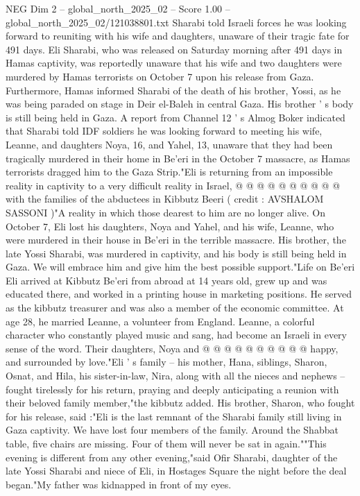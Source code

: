 \begin{textsample}{NEG Dim 2 – global\_north\_2025\_02 – Score 1.00 – global\_north\_2025\_02/121038801.txt}  \label{ex:f2_neg_013}
Sharabi told Israeli forces he was looking forward to reuniting with his wife and daughters, unaware of their tragic fate for 491 days.
Eli Sharabi, who was released on Saturday morning after 491 days in Hamas captivity, was reportedly unaware that his wife and two daughters were murdered by Hamas terrorists on October 7 upon his release from Gaza.
Furthermore, Hamas informed Sharabi of the death of his brother, Yossi, as he was being paraded on stage in Deir el-Baleh in central Gaza.
His brother ' s body is still being held in Gaza.
A report from Channel 12 ' s Almog Boker indicated that Sharabi told IDF soldiers he was looking forward to meeting his wife, Leanne, and daughters Noya, 16, and Yahel, 13, unaware that they had been tragically murdered in their home in Be'eri in the October 7 massacre, as Hamas terrorists dragged him to the Gaza Strip."Eli is returning from an impossible reality in captivity to a very difficult reality in Israel, @ @ @ @ @ @ @ @ @ @ with the families of the abductees in Kibbutz Beeri ( credit : AVSHALOM SASSONI )"A reality in which those dearest to him are no longer alive.
On October 7, Eli lost his daughters, Noya and Yahel, and his wife, Leanne, who were murdered in their house in Be'eri in the terrible massacre.
His brother, the late Yossi Sharabi, was murdered in captivity, and his body is still being held in Gaza.
We will embrace him and give him the best possible support."Life on Be'eri Eli arrived at Kibbutz Be'eri from abroad at 14 years old, grew up and was educated there, and worked in a printing house in marketing positions.
He served as the kibbutz treasurer and was also a member of the economic committee.
At age 28, he married Leanne, a volunteer from England.
Leanne, a colorful character who constantly played music and sang, had become an Israeli in every sense of the word.
Their daughters, Noya and @ @ @ @ @ @ @ @ @ @ happy, and surrounded by love."Eli ' s family -- his mother, Hana, siblings, Sharon, Osnat, and Hila, his sister-in-law, Nira, along with all the nieces and nephews -- fought tirelessly for his return, praying and deeply anticipating a reunion with their beloved family member,"the kibbutz added.
His brother, Sharon, who fought for his release, said :"Eli is the last remnant of the Sharabi family still living in Gaza captivity.
We have lost four members of the family.
Around the Shabbat table, five chairs are missing.
Four of them will never be sat in again.""This evening is different from any other evening,"said Ofir Sharabi, daughter of the late Yossi Sharabi and niece of Eli, in Hostages Square the night before the deal began."My father was kidnapped in front of my eyes.

\end{textsample}
